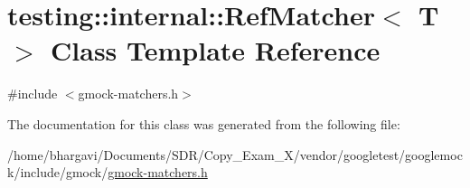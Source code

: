 \hypertarget{classtesting_1_1internal_1_1_ref_matcher}{}\section{testing\+:\+:internal\+:\+:Ref\+Matcher$<$ T $>$ Class Template Reference}
\label{classtesting_1_1internal_1_1_ref_matcher}


{\ttfamily \#include $<$gmock-\/matchers.\+h$>$}



The documentation for this class was generated from the following file\+:\begin{DoxyCompactItemize}
\item 
/home/bhargavi/\+Documents/\+S\+D\+R/\+Copy\+\_\+\+Exam\+\_\+X/vendor/googletest/googlemock/include/gmock/\hyperlink{gmock-matchers_8h}{gmock-\/matchers.\+h}\end{DoxyCompactItemize}
